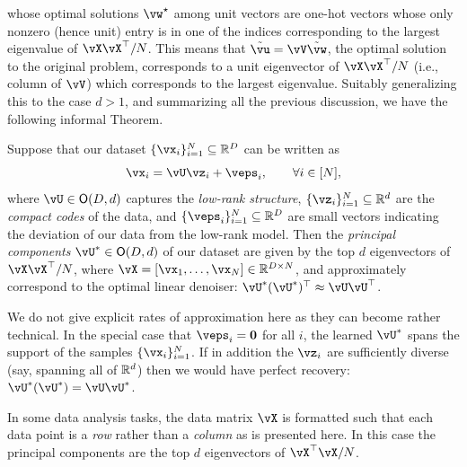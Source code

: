 \documentclass[../../book-main.tex]{subfiles}
\begin{document}
whose optimal solutions \(\vw^{\star}\) among unit vectors are one-hot vectors whose only nonzero (hence unit) entry is in one of the indices corresponding to the largest eigenvalue of \(\vX\vX^{\top}/N\). This means that \(\tilde{\vu} = \vV\tilde{\vw}\), the optimal solution to the original problem, corresponds to a unit eigenvector of \(\vX\vX^{\top}/N\) (i.e., column of \(\vV\)) which corresponds to the largest eigenvalue.  Suitably generalizing this to the case \(d > 1\), and summarizing all the previous discussion, we have the following informal Theorem.
\begin{theorem}\label{thm:pca}
    Suppose that our dataset \(\{\vx_{i}\}_{i = 1}^{N} \subseteq \R^{D}\) can be written as 
    \begin{equation}
        \vx_{i} = \vU\vz_{i} + \veps_{i}, \qquad \forall i \in [N],
    \end{equation}
    where \(\vU \in \O(D, d)\) captures the \textit{low-rank structure}, \(\{\vz_{i}\}_{i = 1}^{N} \subseteq \R^{d}\) are the \textit{compact codes} of the data, and \(\{\veps_{i}\}_{i = 1}^{N} \subseteq \R^{D}\) are small vectors indicating the deviation of our data from the low-rank model. Then the \textit{principal components} \(\vU^{\ast} \in \O(D, d)\) of our dataset are given by the top \(d\) eigenvectors of \(\vX\vX^{\top}/N\), where \(\vX = [\vx_{1}, \dots, \vx_{N}] \in \R^{D \times N}\), and approximately correspond to the optimal linear denoiser: \(\vU^{\ast}(\vU^{\ast})^{\top} \approx \vU\vU^{\top}\).
\end{theorem}
We do not give explicit rates of approximation here as they can become rather technical. In the special case that \(\veps_{i} = \vzero\) for all \(i\), the learned \(\vU^{\ast}\) spans the support of the samples \(\{\vx_{i}\}_{i = 1}^{N}\). If in addition the \(\vz_{i}\) are sufficiently diverse (say, spanning all of \(\mathbb{R}^{d}\)) then we would have perfect recovery: \(\vU^{\ast}(\vU^{\ast}) = \vU\vU^{\ast}\).


\begin{remark}
    In some data analysis tasks, the data matrix \(\vX\) is formatted such that each data point is a \textit{row} rather than a \textit{column} as is presented here. In this case the principal components are the top \(d\) eigenvectors of \(\vX^{\top}\vX/N\).
\end{remark}
\end{document}
